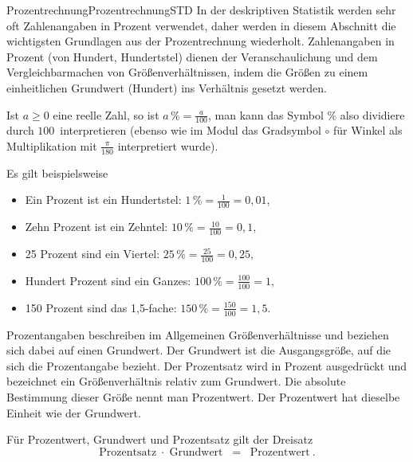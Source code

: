 \begin{MXContent}{Prozentrechnung}{Prozentrechnung}{STD}
In der deskriptiven Statistik werden sehr oft Zahlenangaben in Prozent verwendet, daher werden in diesem Abschnitt
die wichtigsten Grundlagen aus der Prozentrechnung wiederholt. Zahlenangaben in Prozent (\glqq von Hundert, Hundertstel\grqq)
dienen der Veranschaulichung und dem Vergleichbarmachen von Größenverhältnissen, indem die Größen zu einem einheitlichen
Grundwert (Hundert) ins Verhältnis gesetzt werden.

\begin{MInfo}
Ist $a\geq 0$ eine reelle Zahl, so ist $a\,\% = \frac{a}{100}$, man kann das Symbol $\%$ also \glqq dividiere durch $100$\grqq\ interpretieren (ebenso wie im Modul  das Gradsymbol
$\circ$ für Winkel als Multiplikation mit $\frac{\pi}{180}$ interpretiert wurde).
\end{MInfo}


Es gilt beispielsweise
\begin{itemize}
\item{Ein Prozent ist ein Hundertstel: $1\,\%=\frac{1}{100}=0,01$,}
\item{Zehn Prozent ist ein Zehntel: $10\,\%=\frac{10}{100}=0,1,$}
\item{25 Prozent sind ein Viertel: $25\,\%=\frac{25}{100}=0,25,$}
\item{Hundert Prozent sind ein Ganzes: $100\,\%=\frac{100}{100}=1,$}
\item{150 Prozent sind das 1,5-fache: $150\,\%=\frac{150}{100}=1,5.$}
\end{itemize}

Prozentangaben beschreiben im Allgemeinen Größenverhältnisse und beziehen sich dabei auf einen Grundwert.
Der Grundwert ist die Ausgangsgröße, auf die sich die Prozentangabe bezieht.
Der Prozentsatz wird in Prozent ausgedrückt und bezeichnet ein Größenverhältnis relativ zum Grundwert.
Die absolute Bestimmung dieser Größe nennt man Prozentwert. Der Prozentwert hat dieselbe Einheit wie der Grundwert.

\begin{MInfo}
Für Prozentwert, Grundwert und Prozentsatz gilt der Dreisatz
$$
\text{Prozentsatz}\;\cdot\;\text{Grundwert}\;\; =\;\;\text{Prozentwert}\: .
$$
\end{MInfo}

\end{MXContent}

